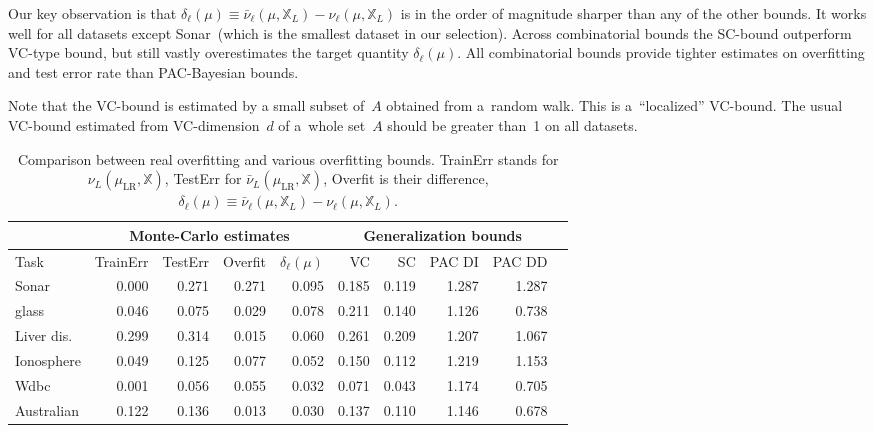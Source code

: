 \documentclass{article} %
\def\XX{\mathbb{X}}
\def\LR{\text{LR}}
\begin{document}
Our key observation is that $\delta_\ell(\mu) \equiv \bar \nu_\ell(\mu, \XX_L) - \nu_\ell(\mu, \XX_L)$
is in the order of magnitude sharper than any of the other bounds.
It works well for all datasets except Sonar~(which is the smallest dataset in our selection).
Across combinatorial bounds the SC-bound outperform VC-type bound, but still vastly overestimates the target quantity $\delta_\ell(\mu)$.
All combinatorial bounds provide tighter estimates on overfitting and test error rate than PAC-Bayesian bounds.

Note that the VC-bound is estimated by a small subset of~$A$ obtained from a~random walk.
This is a~``localized'' VC-bound.
The usual VC-bound estimated from VC-dimension~$d$ of a~whole set~$A$ should be greater than~1 on all datasets.

\begin{table}[t]
      \caption{Comparison between real overfitting and various overfitting bounds.
        TrainErr stands for $\nu_L(\mu_\LR, \XX)$,
        TestErr for $\bar \nu_L(\mu_\LR, \XX)$,
        Overfit is their difference, %
        $\delta_\ell(\mu) \equiv \bar \nu_\ell(\mu, \XX_L) - \nu_\ell(\mu, \XX_L)$.}
      \label{tab:compareToPacBayes}
      \centering
        \begin{tabular}[t]{||l||r|r|r||r|r|r|r|r|r||}
        \hline
        &
        \multicolumn{4}{|c|}{Monte-Carlo estimates}&
        \multicolumn{4}{|c|}{Generalization bounds} \\
        \hline
            Task&
            TrainErr &
            TestErr &
            Overfit &
            $\delta_\ell(\mu)$&
            VC&
            SC&
            PAC DI&
            PAC DD \\
        \hline
            Sonar       & 0.000 & 0.271 & 0.271 & 0.095 & 0.185 & 0.119 & 1.287 & 1.287 \\
            glass       & 0.046 & 0.075 & 0.029 & 0.078 & 0.211 & 0.140 & 1.126 & 0.738 \\
            Liver dis.  & 0.299 & 0.314 & 0.015 & 0.060 & 0.261 & 0.209 & 1.207 & 1.067 \\
            Ionosphere  & 0.049 & 0.125 & 0.077 & 0.052 & 0.150 & 0.112 & 1.219 & 1.153 \\
            Wdbc        & 0.001 & 0.056 & 0.055 & 0.032 & 0.071 & 0.043 & 1.174 & 0.705 \\
            Australian  & 0.122 & 0.136 & 0.013 & 0.030 & 0.137 & 0.110 & 1.146 & 0.678 \\

\end{tabular}
\end{table}
\end{document}
